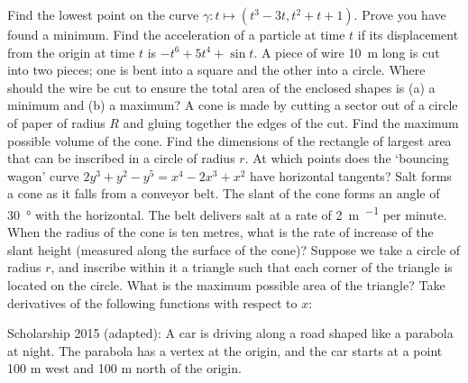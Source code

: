 \begin{questions}
  \questioE Find the lowest point on the curve $ \gamma : t \mapsto (t^3 - 3t, t^2 + t + 1) $. Prove you have found a minimum.
  \questioM Find the acceleration of a particle at time $ t $ if its displacement from the origin at time $ t $ is $ -t^6 + 5t^4 + \sin t $.
  \questioE A piece of wire \SI{10}{\metre} long is cut into two pieces; one is bent into a square and the other into a circle. Where
            should the wire be cut to ensure the total area of the enclosed shapes is (a) a minimum and (b) a maximum?
  \questioM A cone is made by cutting a sector out of a circle of paper of radius $ R $ and gluing together the edges of the cut. Find
            the maximum possible volume of the cone.
  \questioE Find the dimensions of the rectangle of largest area that can be inscribed in a circle of radius $ r $.
  \questioE At which points does the `bouncing wagon' curve $ 2y^3 + y^2 - y^5 = x^4 - 2x^3 + x^2 $ have horizontal tangents?
  \questioE Salt forms a cone as it falls from a conveyor belt. The slant of the cone forms an angle of \SI{30}{\degree} with
            the horizontal. The belt delivers salt at a rate of \SI{2}{\metre\per\cubed} per minute. When the radius of the cone
            is ten metres, what is the rate of increase of the slant height (measured along the surface of the cone)?
  \questioS Suppose we take a circle of radius $ r $, and inscribe within it a triangle such that each corner of the triangle is
            located on the circle. What is the maximum possible area of the triangle?
  \questioE Take derivatives of the following functions with respect to $ x $:
  \questioS Scholarship 2015 (adapted): A car is driving along a road shaped like a parabola at night. The parabola has a vertex at the origin,
            and the car starts at a point 100 m west and 100 m north of the origin.
    \begin{parts}

\end{parts}
\end{questions}
